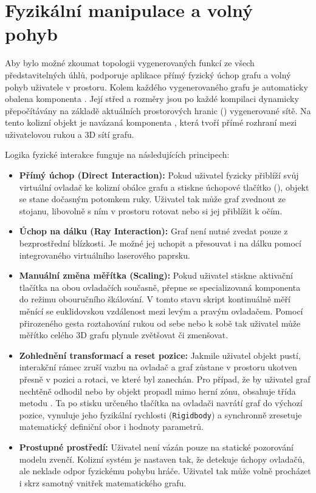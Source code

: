 \documentclass[czech, kiv, sem, he, iso690alph, pdf,viewonly]{fasthesis}
\begin{document}
\section{Fyzikální manipulace a volný pohyb}
Aby bylo možné zkoumat topologii vygenerovaných funkcí ze všech představitelných úhlů, podporuje aplikace přímý fyzický úchop grafu a volný pohyb uživatele v prostoru. 
Kolem každého vygenerovaného grafu je automaticky obalena komponenta . 
Její střed a rozměry jsou po každé kompilaci dynamicky přepočítávány na základě aktuálních prostorových hranic () vygenerované sítě. 
Na tento kolizní objekt je navázaná komponenta , která tvoří přímé rozhraní mezi uživatelovou rukou a 3D sítí grafu.

Logika fyzické interakce funguje na následujících principech:

\begin{itemize}
    \item \textbf{Přímý úchop (Direct Interaction):} Pokud uživatel fyzicky přiblíží svůj virtuální ovladač ke kolizní obálce grafu a stiskne úchopové tlačítko (), objekt se stane dočasným potomkem ruky. Uživatel tak může graf zvednout ze stojanu, libovolně s ním v prostoru rotovat nebo si jej přiblížit k očím.
    
    \item \textbf{Úchop na dálku (Ray Interaction):} Graf není nutné zvedat pouze z bezprostřední blízkosti. Je možné jej uchopit a přesouvat i na dálku pomocí integrovaného virtuálního laserového paprsku.
    
    \item \textbf{Manuální změna měřítka (Scaling):} Pokud uživatel stiskne aktivační tlačítka na obou ovladačích současně, přepne se specializovaná komponenta  do režimu obouručního škálování. V tomto stavu skript kontinuálně měří měnící se euklidovskou vzdálenost mezi levým a pravým ovladačem. Pomocí přirozeného gesta roztahování rukou od sebe nebo k sobě tak uživatel může měřítko celého 3D grafu plynule zvětšovat či zmenšovat.
    
    \item \textbf{Zohlednění transformací a reset pozice:} Jakmile uživatel objekt pustí, interakční rámec zruší vazbu na ovladač a graf zůstane v prostoru ukotven přesně v pozici a rotaci, ve které byl zanechán. Pro případ, že by uživatel graf nechtěně odhodil nebo by objekt propadl mimo herní zónu, obsahuje třída  metodu . Ta po stisku určeného tlačítka na ovladači navrátí graf do výchozí pozice, vynuluje jeho fyzikální rychlosti (\texttt{Rigidbody}) a synchronně zresetuje matematický definiční obor i hodnoty parametrů.
    
    \item \textbf{Prostupné prostředí:} Uživatel není vázán pouze na statické pozorování modelu zvenčí. Kolizní systém je nastaven tak, že detekuje úchopy ovladačů, ale neklade odpor fyzickému pohybu hráče. Uživatel tak může volně procházet i skrz samotný vnitřek matematického grafu.
\end{itemize}
\end{document}
